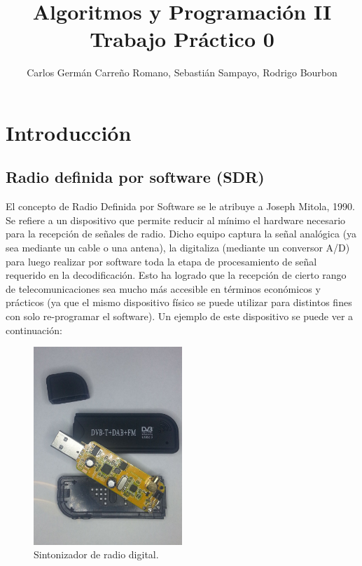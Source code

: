 \documentclass[10pt,a4paper]{article}
\title{Algoritmos y Programación II\\
Trabajo Práctico 0}
\author{Carlos Germán Carreño Romano, Sebastián Sampayo, Rodrigo Bourbon}
\begin{document}
\maketitle
\tableofcontents

\section{Introducción}


\subsection{Radio definida por software (SDR)}

El concepto de Radio Definida por Software se le atribuye a Joseph Mitola, 1990. Se refiere a un dispositivo que permite reducir al mínimo el hardware necesario para la recepción de señales de radio. Dicho equipo captura la señal analógica (ya sea mediante un cable o una antena), la digitaliza (mediante un conversor A/D) para luego realizar por software toda la etapa de procesamiento de señal requerido en la decodificación. Esto ha logrado que la recepción de cierto rango de telecomunicaciones sea mucho más accesible en términos económicos y prácticos (ya que el mismo dispositivo físico se puede utilizar para distintos fines con solo re-programar el software). Un ejemplo de este dispositivo se puede ver a continuación:

\begin{figure}
\begin{centering}
\includegraphics[width=0.5\textwidth]{Imagenes/SDR.jpg}
\par\end{centering}
\caption{Sintonizador de radio digital.}
\end{figure}
\end{document}
